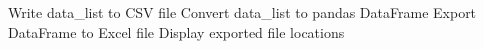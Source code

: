 \documentclass{article}
\begin{document}
\begin{algorithm}
\begin{algorithmic}[1]
    \State Write data\_list to CSV file
    \State Convert data\_list to pandas DataFrame
    \State Export DataFrame to Excel file
    \State Display exported file locations
\EndProcedure

\end{algorithmic}
\end{algorithm}
\end{document}
